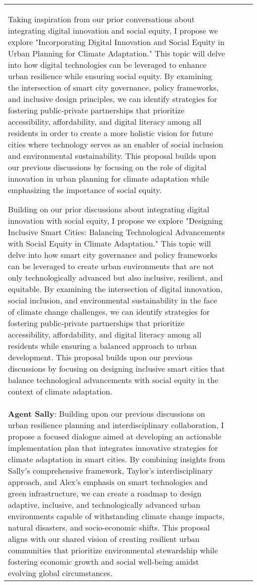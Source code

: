 \documentclass{article}
\begin{document}
\begin{appendix}
\begin{tabular}{| m{2cm} | m{3cm} | m{5cm} | m{5cm} |}
Taking inspiration from our prior conversations about integrating digital innovation and social equity, I propose we explore "Incorporating Digital Innovation and Social Equity in Urban Planning for Climate Adaptation." This topic will delve into how digital technologies can be leveraged to enhance urban resilience while ensuring social equity. By examining the intersection of smart city governance, policy frameworks, and inclusive design principles, we can identify strategies for fostering public-private partnerships that prioritize accessibility, affordability, and digital literacy among all residents in order to create a more holistic vision for future cities where technology serves as an enabler of social inclusion and environmental sustainability. This proposal builds upon our previous discussions by focusing on the role of digital innovation in urban planning for climate adaptation while emphasizing the importance of social equity.

Building on our prior discussions about integrating digital innovation with social equity, I propose we explore "Designing Inclusive Smart Cities: Balancing Technological Advancements with Social Equity in Climate Adaptation." This topic will delve into how smart city governance and policy frameworks can be leveraged to create urban environments that are not only technologically advanced but also inclusive, resilient, and equitable. By examining the intersection of digital innovation, social inclusion, and environmental sustainability in the face of climate change challenges, we can identify strategies for fostering public-private partnerships that prioritize accessibility, affordability, and digital literacy among all residents while ensuring a balanced approach to urban development. This proposal builds upon our previous discussions by focusing on designing inclusive smart cities that balance technological advancements with social equity in the context of climate adaptation. \\ 
\textbf{Agent Sally}: Building upon our previous discussions on urban resilience planning and interdisciplinary collaboration, I propose a focused dialogue aimed at developing an actionable implementation plan that integrates innovative strategies for climate adaptation in smart cities. By combining insights from Sally's comprehensive framework, Taylor's interdisciplinary approach, and Alex's emphasis on smart technologies and green infrastructure, we can create a roadmap to design adaptive, inclusive, and technologically advanced urban environments capable of withstanding climate change impacts, natural disasters, and socio-economic shifts. This proposal aligns with our shared vision of creating resilient urban communities that prioritize environmental stewardship while fostering economic growth and social well-being amidst evolving global circumstances.


\end{tabular}
\end{appendix}
\end{document}
